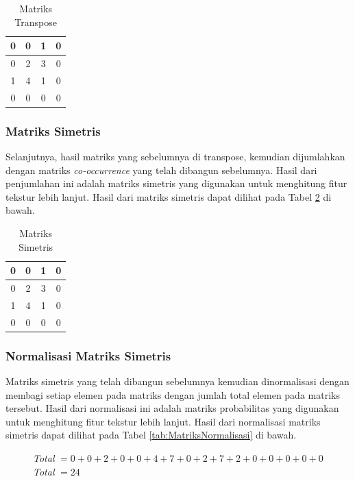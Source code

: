 \begin{table}[H]
\centering
\begin{tabular}{|c|c|c|c|}
\hline
	0 & 0 & 1 & 0 \\ \hline
	0 & 2 & 3 & 0 \\ \hline
	1 & 4 & 1 & 0 \\ \hline
	0 & 0 & 0 & 0 \\ \hline
\end{tabular}
\caption{Matriks Transpose}
\label{tab:MatriksTranspose}
\end{table}

\subsubsection{Matriks Simetris} \label{III.Matriks Transpose dari Matriks Co-occurrence}
Selanjutnya, hasil matriks yang sebelumnya di transpose, kemudian dijumlahkan dengan matriks \textit{co-occurrence} yang telah dibangun sebelumnya. Hasil dari penjumlahan ini adalah matriks simetris yang digunakan untuk menghitung fitur tekstur lebih lanjut. Hasil dari matriks simetris dapat dilihat pada Tabel \ref{tab:MatriksSimetris} di bawah.

\begin{table}[H]
\centering
\begin{tabular}{|c|c|c|c|}
\hline
0 & 0 & 1 & 0 \\ \hline
0 & 2 & 3 & 0 \\ \hline
1 & 4 & 1 & 0 \\ \hline
0 & 0 & 0 & 0 \\ \hline
\end{tabular}
\caption{Matriks Simetris}
\label{tab:MatriksSimetris}
\end{table}

\subsubsection{Normalisasi Matriks Simetris} \label{III.Normalisasi Matriks Simetris}
Matriks simetris yang telah dibangun sebelumnya kemudian dinormalisasi dengan membagi setiap elemen pada matriks dengan jumlah total elemen pada matriks tersebut. Hasil dari normalisasi ini adalah matriks probabilitas yang digunakan untuk menghitung fitur tekstur lebih lanjut. Hasil dari normalisasi matriks simetris dapat dilihat pada Tabel \ref{tab:MatriksNormalisasi} di bawah.

\begin{figure}[H]
\centering
\textit{Total} $= 0 + 0 + 2 + 0 + 0 + 4 + 7 + 0 + 2 + 7 + 2 + 0 + 0 + 0 + 0 + 0$ \\
\textit{Total} $= 24$	
\end{figure}


